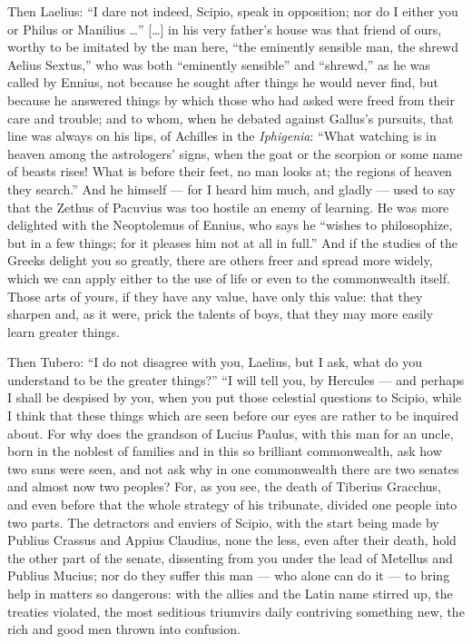  Then Laelius: ``I dare not indeed, Scipio, speak in opposition; nor do I either you or Philus or Manilius \ldots'' [\ldots] in his very father's house was that friend of ours, worthy to be imitated by the man here, ``the eminently sensible man, the shrewd Aelius Sextus,'' who was both ``eminently sensible'' and ``shrewd,'' as he was called by Ennius, not because he sought after things he would never find, but because he answered things by which those who had asked were freed from their care and trouble; and to whom, when he debated against Gallus's pursuits, that line was always on his lips, of Achilles in the \textit{Iphigenia}: ``What watching is in heaven among the astrologers' signs, when the goat or the scorpion or some name of beasts rises! What is before their feet, no man looks at; the regions of heaven they search.'' And he himself --- for I heard him much, and gladly --- used to say that the Zethus of Pacuvius was too hostile an enemy of learning. He was more delighted with the Neoptolemus of Ennius, who says he ``wishes to philosophize, but in a few things; for it pleases him not at all in full.'' And if the studies of the Greeks delight you so greatly, there are others freer and spread more widely, which we can apply either to the use of life or even to the commonwealth itself. Those arts of yours, if they have any value, have only this value: that they sharpen and, as it were, prick the talents of boys, that they may more easily learn greater things.

 Then Tubero: ``I do not disagree with you, Laelius, but I ask, what do you understand to be the greater things?'' ``I will tell you, by Hercules --- and perhaps I shall be despised by you, when you put those celestial questions to Scipio, while I think that these things which are seen before our eyes are rather to be inquired about. For why does the grandson of Lucius Paulus, with this man for an uncle, born in the noblest of families and in this so brilliant commonwealth, ask how two suns were seen, and not ask why in one commonwealth there are two senates and almost now two peoples? For, as you see, the death of Tiberius Gracchus, and even before that the whole strategy of his tribunate, divided one people into two parts. The detractors and enviers of Scipio, with the start being made by Publius Crassus and Appius Claudius, none the less, even after their death, hold the other part of the senate, dissenting from you under the lead of Metellus and Publius Mucius; nor do they suffer this man --- who alone can do it --- to bring help in matters so dangerous: with the allies and the Latin name stirred up, the treaties violated, the most seditious triumvirs daily contriving something new, the rich and good men thrown into confusion.


